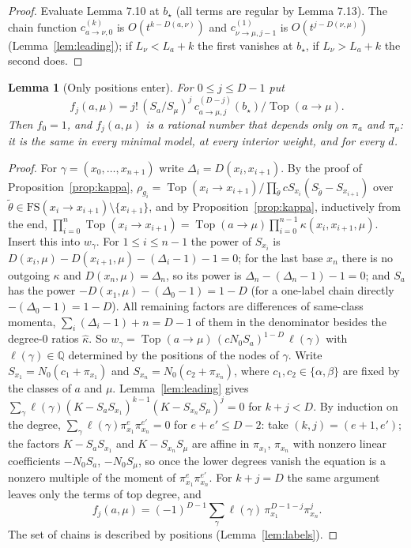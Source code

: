 \documentclass[11pt]{article}
\newtheorem{lemma}[theorem]{Lemma}
\theoremstyle{remark}
\begin{document}
\begin{proof}
Evaluate Lemma 7.10 at $b_\star$ (all terms are regular by Lemma 7.13).  The
chain function $c^{(k)}_{a\to\nu,0}$ is $O(t^{k-D(a,\nu)})$ and
$c^{(1)}_{\nu\to\mu,j-1}$ is $O(t^{j-D(\nu,\mu)})$ (Lemma~\ref{lem:leading});
if $L_\nu<L_a+k$ the first vanishes at $b_\star$, if $L_\nu>L_a+k$ the second
does.
\end{proof}

\begin{lemma}[Only positions enter]\label{lem:positions}
For $0\le j\le D-1$ put
\[
 f_j(a,\mu)=j!\,(S_a/S_\mu)^j\,c^{(D-j)}_{a\to\mu,j}(b_\star)/\operatorname{Top}(a\to\mu).
\]
Then $f_0=1$, and $f_j(a,\mu)$ is a rational number that depends only on
$\pi_a$ and $\pi_\mu$: it is the same in every minimal model, at every
interior weight, and for every $d$.
\end{lemma}

\begin{proof}
For $\gamma=(x_0,\dots,x_{n+1})$ write $\Delta_i=D(x_i,x_{i+1})$.  By the proof
of Proposition~\ref{prop:kappa},
$\rho_{g_i}=\operatorname{Top}(x_i\to x_{i+1})/\prod_{\tilde\theta}cS_{x_i}(S_{\tilde\theta}-S_{x_{i+1}})$
over $\tilde\theta\in\mathrm{FS}(x_i\to x_{i+1})\setminus\{x_{i+1}\}$, and by
Proposition~\ref{prop:kappa}, inductively from the end,
$\prod_{i=0}^n\operatorname{Top}(x_i\to x_{i+1})=\operatorname{Top}(a\to\mu)
\prod_{i=0}^{n-1}\kappa(x_i,x_{i+1},\mu)$.  Insert this into $w_\gamma$.  For
$1\le i\le n-1$ the power of $S_{x_i}$ is
$D(x_i,\mu)-D(x_{i+1},\mu)-(\Delta_i-1)-1=0$; for the last base $x_n$ there is
no outgoing $\kappa$ and $D(x_n,\mu)=\Delta_n$, so its power is
$\Delta_n-(\Delta_n-1)-1=0$; and $S_a$ has the power
$-D(x_1,\mu)-(\Delta_0-1)=1-D$ (for a one-label chain directly
$-(\Delta_0-1)=1-D$).  All remaining factors are differences of
same-class momenta, $\sum_i(\Delta_i-1)+n=D-1$ of them in the denominator
besides the degree-$0$ ratios $\hat\kappa$.  So
$w_\gamma=\operatorname{Top}(a\to\mu)\,(cN_0S_a)^{1-D}\,\ell(\gamma)$ with
$\ell(\gamma)\in\mathbb Q$ determined by the positions of the nodes of
$\gamma$.  Write $S_{x_1}=N_0(c_1+\pi_{x_1})$ and $S_{x_n}=N_0(c_2+\pi_{x_n})$,
where $c_1,c_2\in\{\alpha,\beta\}$ are fixed by the classes of $a$ and $\mu$.
Lemma~\ref{lem:leading} gives
$\sum_\gamma\ell(\gamma)(K-S_aS_{x_1})^{k-1}(K-S_{x_n}S_\mu)^j=0$ for
$k+j<D$.  By induction on the degree,
$\sum_\gamma\ell(\gamma)\pi_{x_1}^{e}\pi_{x_n}^{e'}=0$ for $e+e'\le D-2$: take
$(k,j)=(e+1,e')$; the factors $K-S_aS_{x_1}$ and $K-S_{x_n}S_\mu$ are affine in
$\pi_{x_1}$, $\pi_{x_n}$ with nonzero linear coefficients $-N_0S_a$, $-N_0S_\mu$,
so once the lower degrees vanish the equation is a nonzero multiple of the
moment of $\pi_{x_1}^e\pi_{x_n}^{e'}$.  For $k+j=D$ the same argument leaves
only the terms of top degree, and
\[
 f_j(a,\mu)=(-1)^{D-1}\sum_\gamma\ell(\gamma)\,\pi_{x_1}^{D-1-j}\pi_{x_n}^{j}.
\]
The set of chains is described by positions (Lemma~\ref{lem:labels}).
\end{proof}
\end{document}
